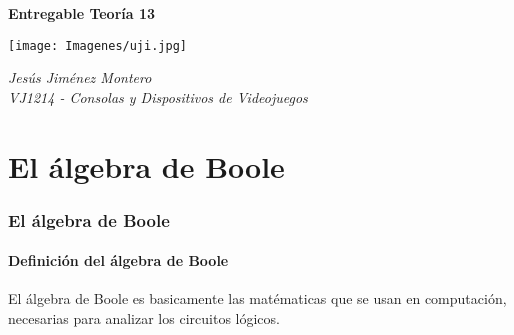 \documentclass[12pt]{article}
\begin{document}
	\nocite{namesans_about}
	\nocite{namesans}
	\nocite{namemono}
	\nocite{atkinson}
	\nocite{circuitverse}
	\nocite{chatgpt}
	\nocite{duke}
	\nocite{texstudio}

\begin{titlepage}
	\begin{center}
		{\Huge \textbf{Entregable Teoría 13}}

		\vspace{2cm}

		\texttt{[image: Imagenes/uji.jpg]}

		\vspace{2cm}

		{\Large \textit{Jesús Jiménez Montero}}\\
		\vspace{1cm}
		{\Large \textit{VJ1214 - Consolas y Dispositivos de Videojuegos}}\\

		\vspace{2cm}
	\end{center}
\end{titlepage}

	\newpage
	\renewcommand{\contentsname}{Tabla de contenidos}
	\setcounter{secnumdepth}{5}
	\tableofcontents
	\setcounter{tocdepth}{4}
	\newpage



		\part{El álgebra de Boole}
		\section{El álgebra de Boole}

		\subsection{Definición del álgebra de Boole \cite{floyd_fundamentos_2006} \cite{logic_gate} \cite{puerta_logica}}
		El álgebra de Boole es basicamente las matématicas que se usan en computación, necesarias para analizar los circuitos lógicos.
\end{document}
